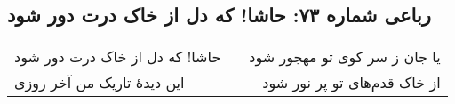 \begin{center}
\section*{رباعی شماره ۷۳: حاشا! که دل از خاک درت دور شود}
\label{sec:073}
\begin{longtable}{l p{0.5cm} r}
حاشا! که دل از خاک درت دور شود
&&
یا جان ز سر کوی تو مهجور شود
\\
این دیدهٔ تاریک من آخر روزی
&&
از خاک قدم‌های تو پر نور شود
\\
\end{longtable}
\end{center}
